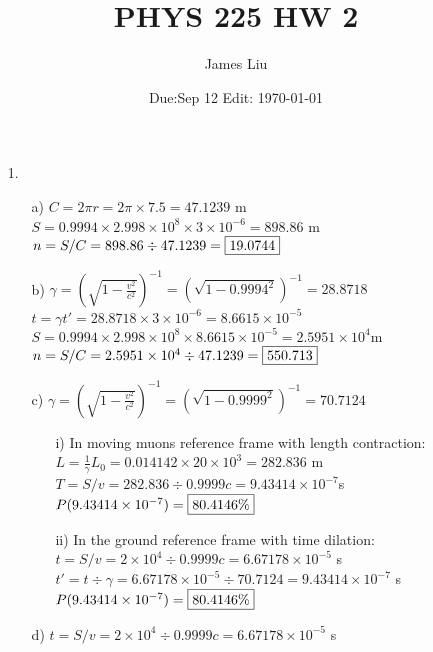 \documentclass{article}
\date{Due:Sep 12 Edit: \today}
\title{PHYS 225 HW 2}
\author{James Liu}
\begin{document}
\maketitle
\begin{itemize}
    \item[1.]
\begin{itemize}
    \item [a)] \(C = 2\pi r = 2\pi\times7.5=47.1239\) m \\ \(S = 0.9994\times 2.998\times 10^8\times3\times10^{-6}=898.86\) m
               \\ \(n = S/C = 898.86 \div 47.1239 = \fbox{19.0744}\)\\
    \item[b)] \(\displaystyle \gamma = \left(\sqrt{1-\frac{v^2}{c^2}}\right)^{-1}= \left(\sqrt{1-0.9994^2}\right)^{-1}=28.8718\)
                \\ \(t = \gamma t' = 28.8718 \times 3\times10^{-6}=8.6615 \times 10^{-5}\)\\
                \(S = 0.9994\times 2.998\times 10^8\times8.6615 \times 10^{-5}=2.5951\times10^4\)m
                \\ \(n = S/C = 2.5951\times10^4 \div 47.1239=\fbox{550.713}\)
    \item[c)] \(\displaystyle\gamma = \left(\sqrt{1-\frac{v^2}{c^2}}\right)^{-1}=\left(\sqrt{1-0.9999^2}\right)^{-1}=70.7124\) %
    \begin{itemize}
        \item [i)] In moving muons reference frame with length contraction:\\
            \(L = \frac{1}{\gamma}L_0 =0.014142\times 20\times 10^3 = 282.836\) m \\
            \(T = S/v = 282.836\div0.9999c = 9.43414\times10^{-7}\)s\\
            \(P(9.43414\times10^{-7}) = \fbox{80.4146\%}\)
        \item [ii)] In the ground reference frame with time dilation:\\
            \(t = S/v = 2\times 10^4 \div 0.9999c = 6.67178\times10^{-5}\) s\\
            \(t' = t\div \gamma = 6.67178\times10^{-5}\div70.7124 = 9.43414\times10^{-7}\) s\\
            \(P(9.43414\times10^{-7}) = \fbox{80.4146\%}\)    
    \end{itemize}
    \item[d)]\(t = S/v = 2\times 10^4 \div 0.9999c = 6.67178\times10^{-5}\) s\\

\end{itemize}
\end{itemize}
\end{document}
